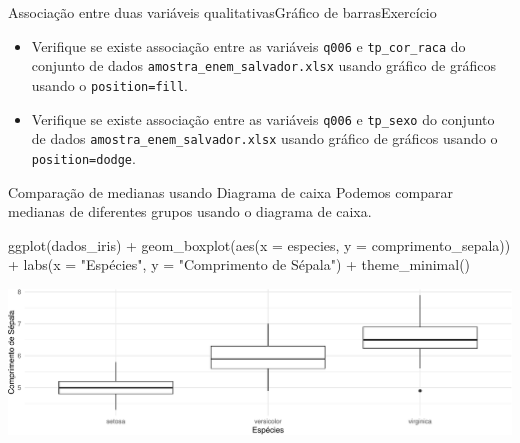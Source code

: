 \documentclass[
  10pt,
  ignorenonframetext,
]{beamer}
\newenvironment{Shaded}{}{}
\newcommand{\DataTypeTok}[1]{#1}
\newcommand{\KeywordTok}[1]{\textcolor[rgb]{0.00,0.00,1.00}{#1}}
\newcommand{\NormalTok}[1]{#1}
\newcommand{\OperatorTok}[1]{#1}
\newcommand{\StringTok}[1]{\textcolor[rgb]{0.00,0.50,0.50}{#1}}
\providecommand{\tightlist}{%
  \setlength{\itemsep}{0pt}\setlength{\parskip}{0pt}}
\begin{document}
\begin{frame}[fragile]{Associação entre duas variáveis
qualitativas\newline Gráfico de barras\newline Exercício}
\protect\hypertarget{associauxe7uxe3o-entre-duas-variuxe1veis-qualitativasgruxe1fico-de-barrasexercuxedcio}{}
\begin{itemize}
\tightlist
\item
  Verifique se existe associação entre as variáveis \texttt{q006} e
  \texttt{tp\_cor\_raca} do conjunto de dados
  \texttt{amostra\_enem\_salvador.xlsx} usando gráfico de gráficos
  usando o \texttt{position=fill}.
\item
  Verifique se existe associação entre as variáveis \texttt{q006} e
  \texttt{tp\_sexo} do conjunto de dados
  \texttt{amostra\_enem\_salvador.xlsx} usando gráfico de gráficos
  usando o \texttt{position=dodge}.
\end{itemize}
\end{frame}

\begin{frame}[fragile]{Comparação de medianas usando Diagrama de caixa}
\protect\hypertarget{comparauxe7uxe3o-de-medianas-usando-diagrama-de-caixa}{}
Podemos comparar medianas de diferentes grupos usando o diagrama de
caixa.

\begin{Shaded}
\begin{Highlighting}[]
\KeywordTok{ggplot}\NormalTok{(dados\_iris) }\OperatorTok{+}
\StringTok{  }\KeywordTok{geom\_boxplot}\NormalTok{(}\KeywordTok{aes}\NormalTok{(}\DataTypeTok{x =}\NormalTok{ especies, }\DataTypeTok{y =}\NormalTok{ comprimento\_sepala)) }\OperatorTok{+}
\StringTok{  }\KeywordTok{labs}\NormalTok{(}\DataTypeTok{x =} \StringTok{"Espécies"}\NormalTok{, }\DataTypeTok{y =} \StringTok{"Comprimento de Sépala"}\NormalTok{) }\OperatorTok{+}
\StringTok{  }\KeywordTok{theme\_minimal}\NormalTok{()}
\end{Highlighting}
\end{Shaded}
\end{frame}

\begin{frame}
\begin{center}\includegraphics[width=1\linewidth]{aulas_files/figure-beamer/unnamed-chunk-79-1} \end{center}
\end{frame}
\end{document}
